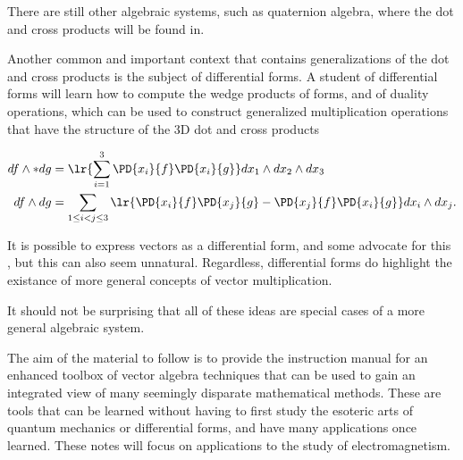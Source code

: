 There are still other algebraic systems, such as quaternion algebra, where the dot and cross products will be found in.  

Another common and important context that contains generalizations of the dot and cross products is the subject of differential forms.
A student of differential forms will learn how to compute the wedge products of forms, and of duality operations, which can be used to construct generalized multiplication operations that have the structure of the 3D dot and cross products

\begin{equation}\label{eqn:GAmotivation:160}
\begin{aligned}
df \wedge * dg &= \lr{ \sum_{i=1}^3 \PD{x_i}{f} \PD{x_i}{g} } dx_1 \wedge dx_2 \wedge dx_3 \\
df \wedge dg &= \sum_{1 \le i < j \le 3} \lr{
\PD{x_i}{f} \PD{x_j}{g} 
-\PD{x_j}{f} \PD{x_i}{g} 
}
dx_i \wedge dx_j.
\end{aligned}
\end{equation}

It is possible to express vectors as a differential form, and some advocate for this \citep{flanders1989dfa}, but this can also seem unnatural.  Regardless, differential forms do highlight the existance of more general concepts of vector multiplication.  %

It should not be surprising that all of these ideas are special cases of a more general algebraic system.

The aim of the material to follow is to provide the instruction manual for an enhanced toolbox of vector algebra techniques that can be used to gain an integrated view of many seemingly disparate mathematical methods.  These are tools that can be learned without having to first study the esoteric arts of quantum mechanics or differential forms, and have many applications once learned.  These notes will focus on applications to the study of electromagnetism.



